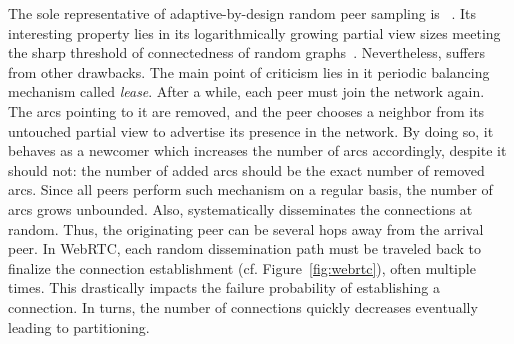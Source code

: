 The sole representative of adaptive-by-design random peer sampling is
\SCAMP~\cite{ganesh2003peer}. Its interesting property lies in its
logarithmically growing partial view sizes meeting the sharp threshold of
connectedness of random graphs~\cite{erdos1959random}. Nevertheless, \SCAMP
suffers from other drawbacks. The main point of criticism lies in it periodic
balancing mechanism called \emph{lease}. After a while, each peer must join the
network again. The arcs pointing to it are removed, and the peer chooses a
neighbor from its untouched partial view to advertise its presence in the
network. By doing so, it behaves as a newcomer which increases the number of
arcs accordingly, despite it should not: the number of added arcs should be the
exact number of removed arcs. Since all peers perform such mechanism on a
regular basis, the number of arcs grows unbounded.  Also, \SCAMP systematically
disseminates the connections at random. Thus, the originating peer can be
several hops away from the arrival peer. In WebRTC, each random dissemination
path must be traveled back to finalize the connection establishment
(cf. Figure~\ref{fig:webrtc}), often multiple times. This drastically impacts
the \SCAMP failure probability of establishing a connection. In turns, the
number of connections quickly decreases eventually leading to partitioning.



